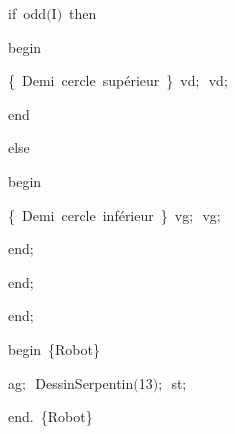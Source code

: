 {\pagebreak[3] 
\vspace{\neglskip}\mbox{\blc  \blk\blk\blk\blk\idt  \mcl if\idt \ odd$($I$)$\ \mcl then\idt }\par 
\vspace{\neglskip}\mbox{\blc  \blk\blk\blk\blk\blk\idt  \mcl begin\idt }\par 
\vspace{\neglskip}\mbox{\blc  \blk\blk\blk\blk\blk\blk\idt  \cmt  \{\ Demi\ cercle\ supérieur\ \}\idt \ vd$;$\ vd$;$\ }\par 
\vspace{\neglskip}\mbox{\blc  \blk\blk\blk\blk\blk\idt  \mcl end\idt }\par 
\pagebreak[3] 
\vspace{\neglskip}\mbox{\blc  \blk\blk\blk\blk\idt  \mcl else\idt }\par 
\vspace{\neglskip}\mbox{\blc  \blk\blk\blk\blk\blk\idt  \mcl begin\idt }\par 
\vspace{\neglskip}\mbox{\blc  \blk\blk\blk\blk\blk\blk\idt  \cmt  \{\ Demi\ cercle\ inférieur\ \}\idt \ vg$;$\ vg$;$\ }\par 
\vspace{\neglskip}\mbox{\blc  \blk\blk\blk\blk\blk\idt  \mcl end\idt $;$}\par 
\vspace{\neglskip}\mbox{\blc  \blk\blk\idt  \mcl end\idt $;$}\par 
\vspace{\neglskip}\mbox{\blc  \blk\idt  \mcl end\idt $;$}\par 
\medskip

\vspace{\neglskip}\mbox{\blc  \idt  \mcl begin\idt \ \cmt  \{Robot\}\idt }\par 
\vspace{\neglskip}\mbox{\blc  \blk\idt  ag$;$\ DessinSerpentin$($13$)$$;$\ st$;$\ }\par 
\vspace{\neglskip}\mbox{\blc  \idt  \mcl end\idt $.$\ \cmt  \{Robot\}\idt }\par 

\medskip }

